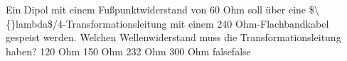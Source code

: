     {Ein Dipol mit einem Fußpunktwiderstand von 60 Ohm soll über eine \$\textbackslash\{\}lambda\$/4-Transformationsleitung mit einem 240 Ohm-Flachbandkabel gespeist werden. Welchen Wellenwiderstand muss die Transformationsleitung haben?}
    {120 Ohm}
    {150 Ohm}
    {232 Ohm}
    {300 Ohm}
    {false}{false}